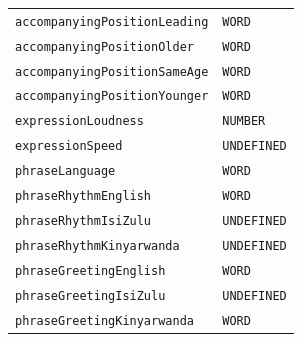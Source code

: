 \documentclass{CSSRforAfrica}
\begin{document}
\begin{table}[H]
\begin{tabular}{l l}
{\footnotesize \verb+accompanyingPositionLeading+} 	                     & {\footnotesize \verb+WORD+} \vspace{-1.5mm}\\
{\footnotesize \verb+accompanyingPositionOlder+} 	                     & {\footnotesize \verb+WORD+} \vspace{-1.5mm}  \\
{\footnotesize \verb+accompanyingPositionSameAge+}                     & {\footnotesize \verb+WORD+} \vspace{-1.5mm} \\
{\footnotesize \verb+accompanyingPositionYounger+}                      & {\footnotesize \verb+WORD+}  \vspace{-1.5mm} \\
{\footnotesize \verb+expressionLoudness+}                                      & {\footnotesize \verb+NUMBER+ } \vspace{-1.5mm} \\
{\footnotesize \verb+expressionSpeed+}                                           & {\footnotesize \verb+UNDEFINED+ } \vspace{-1.5mm} \\
{\footnotesize \verb+phraseLanguage+}                                            & {\footnotesize \verb+WORD+} \vspace{-1.5mm}  \\
{\footnotesize \verb+phraseRhythmEnglish+}                                    & {\footnotesize \verb+WORD+}\vspace{-1.5mm} \\
{\footnotesize \verb+phraseRhythmIsiZulu+}                                     & {\footnotesize \verb+UNDEFINED+}\vspace{-1.5mm} \\
{\footnotesize \verb+phraseRhythmKinyarwanda+}                            & {\footnotesize \verb+UNDEFINED+}\vspace{-1.5mm} \\
{\footnotesize \verb+phraseGreetingEnglish+}                                   & {\footnotesize \verb+WORD+}\vspace{-1.5mm} \\
{\footnotesize \verb+phraseGreetingIsiZulu+}                                   & {\footnotesize \verb+UNDEFINED+}\vspace{-1.5mm} \\
{\footnotesize \verb+phraseGreetingKinyarwanda+}                          & {\footnotesize \verb+WORD+}\vspace{-1.5mm} \\

\end{tabular}
\end{table}
\end{document}
